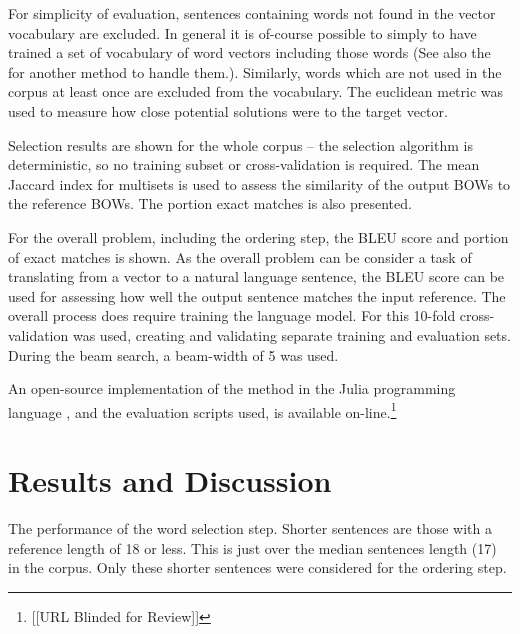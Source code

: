 \documentclass[11pt]{article}
\theoremstyle{plain}
\theoremstyle{definition}
\begin{document}
For simplicity of evaluation, sentences containing words not found in the vector vocabulary are excluded.  In general it is of-course possible to simply to have trained a set of vocabulary of word vectors including those words (See also the  for another method to handle them.). Similarly, words which are not used in the corpus at least once are excluded from the vocabulary. The euclidean metric was used to measure how close potential solutions were to the target vector.

Selection results are shown for the whole corpus -- the selection algorithm is deterministic, so no training subset or cross-validation is required. The mean Jaccard index for multisets is used to assess the similarity of the output BOWs to the reference BOWs. The portion exact matches is also presented.

For the overall problem, including the ordering step, the BLEU score and portion of exact matches is shown. As the overall problem can be consider a task of translating from a vector to a natural language sentence, the BLEU  score \parencite{Papineni2002} can be used for assessing how well the output sentence matches the input reference. The overall process does require training the language model. For this 10-fold cross-validation was used, creating and validating separate training and evaluation sets. During the beam search, a beam-width of 5 was used.

An open-source implementation of the method in the Julia programming language \textcite{Julia}, and the evaluation scripts used, is available on-line.\footnote{[[URL Blinded for Review]]}

\section{Results and Discussion} \label{results}

\begin{table}
	\caption{ The performance of the word selection step. Shorter sentences are those with a reference length of 18 or less. This is just over the median sentences length (17) in the corpus. Only these shorter sentences were considered for the ordering step.}
	\label{table:overall}
\end{table}
\end{document}
